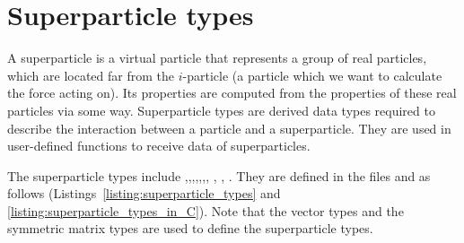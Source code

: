 \section{Superparticle types}
\label{sec:super_particle_types}
A superparticle is a virtual particle that represents a group of real particles, which are located far from the $i$-particle (a particle which we want to calculate the force acting on). Its properties are computed from the properties of these real particles via some way. Superparticle types are derived data types required to describe the interaction between a particle and a superparticle. They are used in user-defined functions to receive data of superparticles.

The superparticle types include ,,,,,,, , ,  . They are defined in the files  and  as follows (Listings~\ref{listing:superparticle_types} and \ref{listing:superparticle_types_in_C}). Note that the vector types and the symmetric matrix types are used to define the superparticle types.

